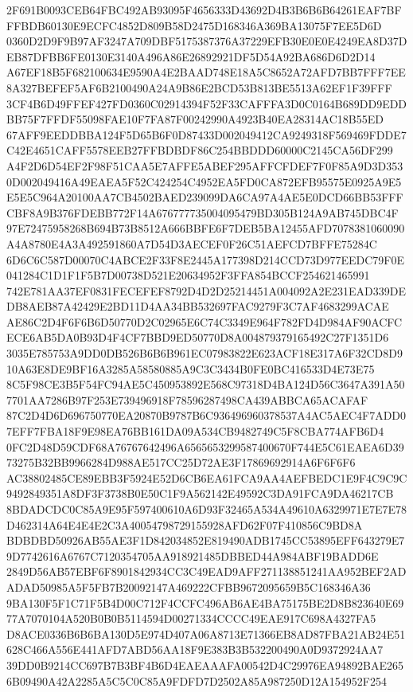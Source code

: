 \documentclass[UTF8,fontset=fandol,zihao=-4,a4paper]{ctexart}
\begin{document}
{{2F691B0093CEB64FBC492AB93095F4656333D43692D4B3B6B6B64261EAF7BFFFBDB60130E9ECFC4852D809B58D2475D168346A369BA13075F7EE5D6D
0360D2D9F9B97AF3247A709DBF5175387376A37229EFB30E0E0E4249EA8D37DEB87DFBB6FE0130E3140A496A86E26892921DF5D54A92BA686D6D2D14
A67EF18B5F682100634E9590A4E2BAAD748E18A5C8652A72AFD7BB7FFF7EE8A327BEFEF5AF6B2100490A24A9B86E2BCD53B813BE5513A62EF1F39FFF
3CF4B6D49FFEF427FD0360C02914394F52F33CAFFFA3D0C0164B689DD9EDDBB75F7FFDF55098FAE10F7FA87F00242990A4923B40EA28314AC18B55ED
67AFF9EEDDBBA124F5D65B6F0D87433D002049412CA9249318F569469FDDE7C42E4651CAFF5578EEB27FFBDBDF86C254BBDDD60000C2145CA56DF299
A4F2D6D54EF2F98F51CAA5E7AFFE5ABEF295AFFCFDEF7F0F85A9D3D3530D002049416A49EAEA5F52C424254C4952EA5FD0CA872EFB95575E0925A9E5
E5E5C964A20100AA7CB4502BAED239099DA6CA97A4AE5E0DCD66BB53FFFCBF8A9B376FDEBB772F14A676777735004095479BD305B124A9AB745DBC4F
97E72475958268B694B73B8512A666BBFE6F7DEB5BA12455AFD7078381060090A4A8780E4A3A492591860A7D54D3AECEF0F26C51AEFCD7BFFE75284C
6D6C6C587D00070C4ABCE2F33F8E2445A177398D214CCD73D977EEDC79F0E041284C1D1F1F5B7D00738D521E20634952F3FFA854BCCF254621465991
742E781AA37EF0831FECEFEF8792D4D2D25214451A004092A2E231EAD339DEDB8AEB87A42429E2BD11D4AA34BB532697FAC9279F3C7AF4683299ACAE
AE86C2D4F6F6B6D50770D2C02965E6C74C3349E964F782FD4D984AF90ACFCECE6AB5DA0B93D4F4CF7BBD9ED50770D8A004879379165492C27F1351D6
3035E785753A9DD0DB526B6B6B961EC07983822E623ACF18E317A6F32CD8D910A63E8DE9BF16A3285A58580885A9C3C3434B0FE0BC416533D4E73E75
8C5F98CE3B5F54FC94AE5C450953892E568C97318D4BA124D56C3647A391A507701AA7286B97F253E739496918F78596287498CA439ABBCA65ACAFAF
87C2D4D6D696750770EA20870B9787B6C936496960378537A4AC5AEC4F7ADD07EFF7FBA18F9E98EA76BB161DA09A534CB9482749C5F8CBA774AFB6D4
0FC2D48D59CDF68A76767642496A6565653299587400670F744E5C61EAEA6D3973275B32BB9966284D988AE517CC25D72AE3F17869692914A6F6F6F6
AC38802485CE89EBB3F5924E52D6CB6EA61FCA9AA4AEFBEDC1E9F4C9C9C9492849351A8DF3F3738B0E50C1F9A562142E49592C3DA91FCA9DA46217CB
8BDADCDC0C85A9E95F597400610A6D93F32465A534A49610A6329971E7E7E78D462314A64E4E4E2C3A40054798729155928AFD62F07F410856C9BD8A
BDBDBD50926AB55AE3F1D842034852E819490ADB1745CC53895EFF643279E79D7742616A6767C7120354705AA918921485DBBED44A984ABF19BADD6E
2849D56AB57EBF6F8901842934CC3C49EAD9AFF271138851241AA952BEF2ADADAD50985A5F5FB7B20092147A469222CFBB9672095659B5C168346A36
9BA130F5F1C71F5B4D00C712F4CCFC496AB6AE4BA75175BE2D8B823640E6977A7070104A520B0B0B5114594D00271334CCCC49EAE917C698A4327FA5
D8ACE0336B6B6BA130D5E974D407A06A8713E71366EB8AD87FBA21AB24E51628C466A556E441AFD7ABD56AA18F9E383B3B532200490A0D9372924AA7
39DD0B9214CC697B7B3BF4B6D4EAEAAAFA00542D4C29976EA94892BAE2656B09490A42A2285A5C5C0C85A9FDFD7D2502A85A987250D12A154952F254
}}
\end{document}
